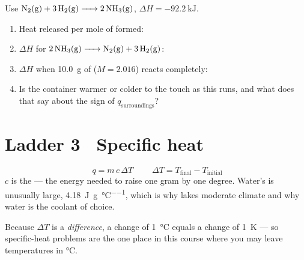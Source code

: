 \documentclass{apchem-worksheet}
\begin{document}
\begin{yourturn}
Use $\ce{N2(g) + 3H2(g) -> 2NH3(g)}$, $\Delta H = \SI{-92.2}{\kilo\joule}$.
\begin{enumerate}[leftmargin=*,itemsep=0.5em]
  \item Heat released per mole of  formed: \workspace[1.4cm]
  \item $\Delta H$ for $\ce{2NH3(g) -> N2(g) + 3H2(g)}$:
        \workspace[1.4cm]
  \item $\Delta H$ when \SI{10.0}{\gram} of 
        ($M = 2.016$) reacts completely: \workspace[1.8cm]
  \item Is the container warmer or colder to the touch as this runs, and
        what does that say about the sign of $q_{\text{surroundings}}$?
        \workspace[1.4cm]
\end{enumerate}
\end{yourturn}

\section*{\sffamily Ladder 3 \textbullet\ Specific heat}

\[ \boxed{\;q = m\,c\,\Delta T\;} \qquad
   \Delta T = T_{\text{final}} - T_{\text{initial}} \]
$c$ is the  --- the energy needed to raise
one gram by one degree. Water's is unusually large,
\SI{4.18}{\joule\per\gram\per\celsius}, which is why lakes moderate
climate and why water is the coolant of choice.

Because $\Delta T$ is a \emph{difference}, a change of \SI{1}{\celsius}
equals a change of \SI{1}{\kelvin} --- so specific-heat problems are the
one place in this course where you may leave temperatures in
\si{\celsius}.
\end{document}
